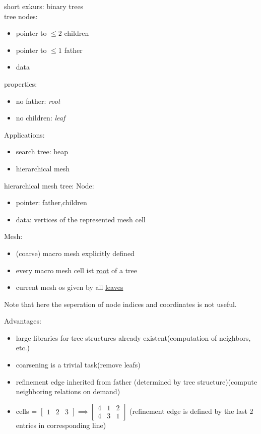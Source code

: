 short exkurs: binary trees\\
tree nodes:
\begin{itemize}
	\item pointer to $\leq 2$ children
	\item pointer to $\leq 1$ father
	\item data
	
\end{itemize}
properties:
\begin{itemize}
	\item no father: \textit{root}
	\item no children: \textit{leaf}
\end{itemize}

Applications:
\begin{itemize}
	\item search tree: heap
	\item hierarchical mesh
\end{itemize}

hierarchical mesh tree:
Node:
\begin{itemize}
	\item pointer: father,children
	\item data: vertices of the represented mesh cell
\end{itemize}

Mesh:
\begin{itemize}
	\item (coarse) macro mesh explicitly defined
	\item every macro mesh cell ist \underline{root} of a tree
	\item current mesh os given by all \underline{leaves}
	
\end{itemize}

Note that here the seperation of node indices and coordinates is not useful.\vspace{1cm}

Advantages:
\begin{itemize}
	\item large libraries for tree structures already existent(computation of neighbors, etc.)
	\item coarsening is a trivial task(remove leafs)
	\item refinement edge inherited from father (determined by tree structure)(compute neighboring relations \glqq on demand\grqq)
	
	\item cells = 
	$\begin{bmatrix}
	1 & 2 & 3
	\end{bmatrix} \implies 
	\begin{bmatrix}
	4 & 1 & 2\\
	4 & 3 & 1
	\end{bmatrix} $ (refinement edge is defined by the last 2 entries in corresponding line)
\end{itemize}

